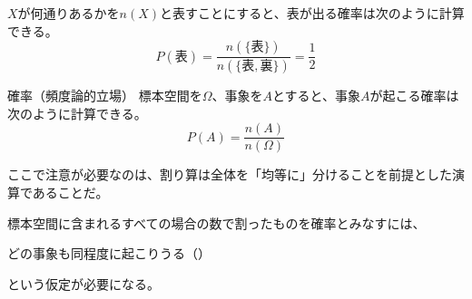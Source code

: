 \documentclass[../../../topic_statistics]{subfiles}
\begin{document}
\br

$X$が何通りあるかを$n(X)$と表すことにすると、表が出る確率は次のように計算できる。
\begin{equation*}
  P(\text{表}) = \frac{n(\{ \text{表} \})}{n(\{ \text{表}, \text{裏} \})} = \frac{1}{2}
\end{equation*}

\begin{definition}{確率（頻度論的立場）}
  標本空間を$\Omega$、事象を$A$とすると、事象$A$が起こる確率は次のように計算できる。
  \begin{equation*}
    P(A) = \frac{n(A)}{n(\Omega)}
  \end{equation*}
\end{definition}

\br

ここで注意が必要なのは、割り算は全体を「均等に」分けることを前提とした演算であることだ。

標本空間に含まれるすべての場合の数で割ったものを確率とみなすには、
\begin{emphabox}
  \begin{spacebox}
    \begin{center}
      どの事象も同程度に起こりうる（）
    \end{center}
  \end{spacebox}
\end{emphabox}
という仮定が必要になる。
\end{document}
